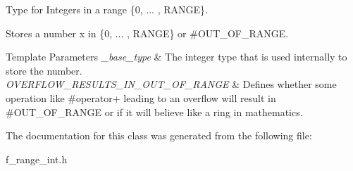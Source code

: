 Type for Integers in a range \{0, ... , R\+A\+N\+GE\}. 

Stores a number x in \{0, ... , R\+A\+N\+GE\} or \#\+O\+U\+T\+\_\+\+O\+F\+\_\+\+R\+A\+N\+GE. 
\begin{DoxyTemplParams}{Template Parameters}
{\em \+\_\+base\+\_\+type} & The integer type that is used internally to store the number. \\
\hline
{\em O\+V\+E\+R\+F\+L\+O\+W\+\_\+\+R\+E\+S\+U\+L\+T\+S\+\_\+\+I\+N\+\_\+\+O\+U\+T\+\_\+\+O\+F\+\_\+\+R\+A\+N\+GE} & Defines whether some operation like \#operator+ leading to an overflow will result in \#\+O\+U\+T\+\_\+\+O\+F\+\_\+\+R\+A\+N\+GE or if it will believe like a ring in mathematics. \\
\hline
\end{DoxyTemplParams}


The documentation for this class was generated from the following file\+:\begin{DoxyCompactItemize}
\item 
f\+\_\+range\+\_\+int.\+h\end{DoxyCompactItemize}
